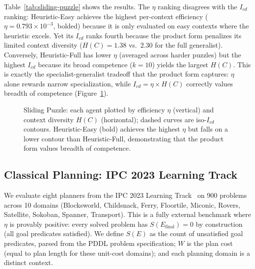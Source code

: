 \documentclass[runningheads,a4paper]{llncs}
\begin{document}
Table~\ref{tab:sliding-puzzle} shows the results. The $\eta$ ranking disagrees with the $I_{cd}$ ranking: Heuristic-Easy achieves the highest per-context efficiency ($\eta = 0.793 \times 10^{-3}$, bolded) because it is only evaluated on easy contexts where the heuristic excels. Yet its $I_{cd}$ ranks fourth because the product form penalizes its limited context diversity ($H(C) = 1.38$ vs.\ $2.30$ for the full generalist). Conversely, Heuristic-Full has lower $\eta$ (averaged across harder puzzles) but the highest $I_{cd}$ because its broad competence ($k = 10$) yields the largest $H(C)$. This is exactly the specialist-generalist tradeoff that the product form captures: $\eta$ alone rewards narrow specialization, while $I_{cd} = \eta \times H(C)$ correctly values breadth of competence (Figure~\ref{fig:sliding-puzzle}).

\begin{figure}[t]
\centering

\caption{Sliding Puzzle: each agent plotted by efficiency $\eta$ (vertical) and context diversity $H(C)$ (horizontal); dashed curves are iso-$I_{cd}$ contours. Heuristic-Easy (bold) achieves the highest $\eta$ but falls on a lower contour than Heuristic-Full, demonstrating that the product form values breadth of competence.}
\label{fig:sliding-puzzle}
\end{figure}

\subsection{Classical Planning: IPC 2023 Learning Track}
\label{sec:ipc}

We evaluate eight planners from the IPC 2023 Learning Track~\cite{seipp2024ipc} on 900 problems across 10 domains (Blocksworld, Childsnack, Ferry, Floortile, Miconic, Rovers, Satellite, Sokoban, Spanner, Transport). This is a fully external benchmark where $\eta$ is provably positive: every solved problem has $S(E_\text{final}) = 0$ by construction (all goal predicates satisfied). We define $S(E)$ as the count of unsatisfied goal predicates, parsed from the PDDL problem specification; $W$ is the plan cost (equal to plan length for these unit-cost domains); and each planning domain is a distinct context.
\end{document}
